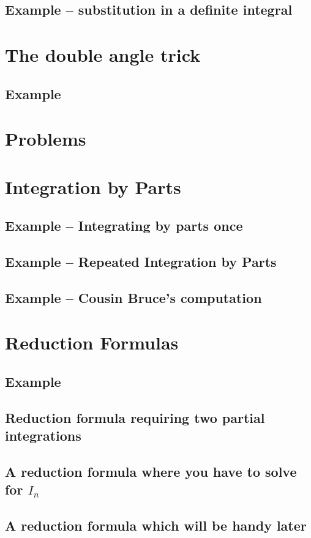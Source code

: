 \subsection{Example -- substitution in a definite integral}
\section{The double angle trick}
\subsection{Example}
\section{Problems}
\section{Integration by Parts}
\subsection{Example -- Integrating by parts once}
\subsection{Example -- Repeated Integration by Parts}
\subsection{Example -- Cousin Bruce's computation}
\section{Reduction Formulas}
\subsection{Example}
\subsection{Reduction formula requiring two partial integrations}
\subsection{A reduction formula where you have to solve for $I_n$}
\subsection{A reduction formula which will be handy later}
